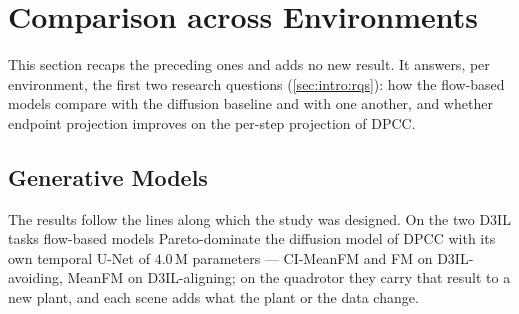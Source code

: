 \section{Comparison across Environments}\label{sec:res:summary}

This section recaps the preceding ones and adds no new result. It answers, per environment, the first two
research questions (\autoref{sec:intro:rqs}): how the flow-based models compare with the diffusion baseline
and with one another, and whether endpoint projection improves on the per-step projection of \ac{DPCC}.

\subsection{Generative Models}\label{sec:res:summary:models}

The results follow the lines along which the study was designed. On the two D3IL tasks flow-based models
Pareto-dominate the diffusion model of \ac{DPCC} with its own temporal U-Net of $4.0$\,M parameters ---
CI-MeanFM and FM on D3IL-avoiding, MeanFM on D3IL-aligning; on the quadrotor they carry that result to a
new plant, and each scene adds what the plant or the data change.

